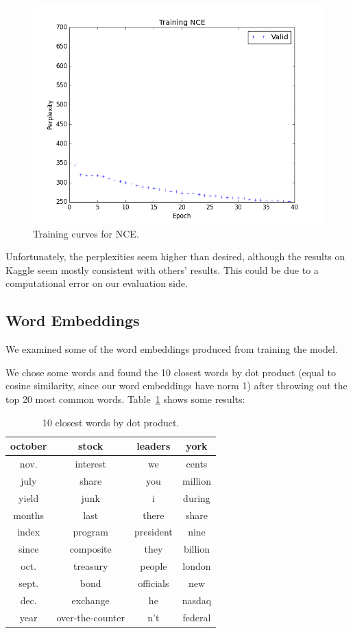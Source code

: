 \documentclass[11pt]{article}
\begin{document}
\begin{figure}[H]
\centering
\includegraphics[scale=0.5]{nce_train}
\caption{Training curves for NCE.}
\end{figure}

Unfortunately, the perplexities seem higher than desired, although the results on Kaggle seem mostly consistent with others' results. This could be due to a computational error on our evaluation side.

\subsection{Word Embeddings}

We examined some of the word embeddings produced from training the model. 

We chose some words and found the 10 closest words by dot product (equal to cosine similarity, since our word embeddings have norm 1) after throwing out the top 20 most common words. Table~\ref{tab:close} shows some results:

\begin{table}[h]
  \centering
  \begin{tabular}{c|c|c|c}
    october & stock & leaders & york  \\
    \midrule
nov. & interest & we & cents \\
july & share & you & million \\
yield & junk & i & during \\
months & last & there & share \\
index & program & president  & nine \\
since & composite & they & billion \\
oct. & treasury & people & london \\
sept. & bond & officials & new \\ 
dec. & exchange & he & nasdaq \\
year & over-the-counter & n't & federal
  \end{tabular}
  \caption{10 closest words by dot product.}\label{tab:close} 
\end{table}
\end{document}
